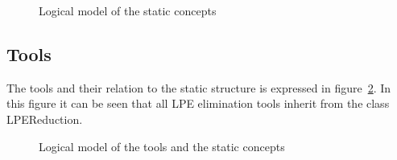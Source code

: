 \documentclass[a4paper,fleqn]{article}
\begin{document}
\begin{landscape}
\begin{figure}[hbtp]
\begin{center}
\end{center}
\caption{Logical model of the static concepts}\label{fig:logic:static}
\end{figure}
\end{landscape}

\subsection{Tools}

The tools and their relation to the static structure is expressed in
figure~\ref{fig:logic:tools:static}. In this figure it can be seen that all LPE
elimination tools inherit from the class LPEReduction.

\begin{figure}[hbtp]
\caption{Logical model of the tools and the static
concepts}\label{fig:logic:tools:static}
\end{figure}
\end{document}
